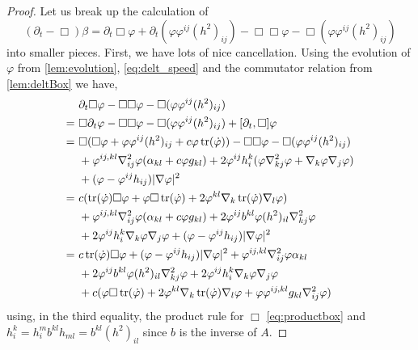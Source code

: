 \documentclass{amsart}
\begin{document}
\begin{proof}
Let us break up the calculation of
\[
(\partial_{t} - \Box)\beta =  \partial_{t}\Box\varphi + \partial_{t} (\varphi\varphi^{ij} (h^2)_{ij}) - \Box\Box\varphi - \Box(\varphi\varphi^{ij} (h^2)_{ij})
\]
into smaller pieces. First, we have lots of nice cancellation. Using the evolution of \(\varphi\) from \cref{lem:evolution}, \cref{eq:delt_speed} and the commutator relation from \cref{lem:deltBox} we have,
\begin{equation}
\label{eq:deltbeta1}
\begin{split}
&\partial_{t}\Box\varphi - \Box\Box\varphi - \Box(\varphi\varphi^{ij} (h^2)_{ij})\\ =\ &\Box\partial_t\varphi - \Box\Box\varphi - \Box(\varphi\varphi^{ij} (h^2)_{ij}) + [\partial_t, \Box] \varphi \\
=\ &\Box(\Box \varphi + \varphi\varphi^{ij}(h^2)_{ij} + c \varphi\operatorname{tr}(\dot{\varphi})) - \Box\Box\varphi - \Box(\varphi\varphi^{ij} (h^2)_{ij})\\
\quad &+ \varphi^{ij,kl} \nabla^2_{ij} \varphi (\alpha_{kl} + c \varphi g_{kl}) + 2\varphi^{ij}h^{k}_{i} (\varphi \nabla^2_{kj} \varphi + \nabla_k \varphi \nabla_j \varphi)\\ 
\quad &+ (\varphi - \varphi^{ij}h_{ij})| \nabla\varphi|^{2} \\
=\ &c (\operatorname{tr}(\dot{\varphi}) \Box \varphi + \varphi \Box \operatorname{tr}(\dot{\varphi}) + 2 \varphi^{kl} \nabla_k \operatorname{tr}(\dot{\varphi}) \nabla_l \varphi) \\
\quad &+ \varphi^{ij,kl} \nabla^2_{ij} \varphi (\alpha_{kl} + c \varphi g_{kl}) + 2\varphi^{ij}b^{kl} \varphi (h^2)_{il} \nabla^2_{kj} \varphi\\
\quad  &+ 2\varphi^{ij}h^{k}_{i} \nabla_k \varphi \nabla_j \varphi + (\varphi - \varphi^{ij}h_{ij})| \nabla\varphi|^{2} \\
=\ &c \operatorname{tr}(\dot{\varphi}) \Box \varphi + (\varphi - \varphi^{ij}h_{ij})| \nabla\varphi|^{2}  + \varphi^{ij,kl} \nabla^2_{ij} \varphi \alpha_{kl} \\
\quad &+ 2\varphi^{ij}b^{kl} \varphi (h^2)_{il} \nabla^2_{kj} \varphi + 2\varphi^{ij}h^{k}_{i} \nabla_k \varphi \nabla_j \varphi \\
\quad &+ c(\varphi \Box \operatorname{tr}(\dot{\varphi}) + 2 \varphi^{kl} \nabla_k \operatorname{tr}(\dot{\varphi}) \nabla_l \varphi + \varphi \varphi^{ij,kl} g_{kl} \nabla^2_{ij} \varphi)
\end{split}
\end{equation}
using, in the third equality, the product rule for \(\Box\) \cref{eq:productbox} and \(h^k_i = h^m_i b^{kl}h_{ml} = b^{kl} (h^2)_{il}\) since \(b\) is the inverse of \(A\).


\end{proof}
\end{document}
